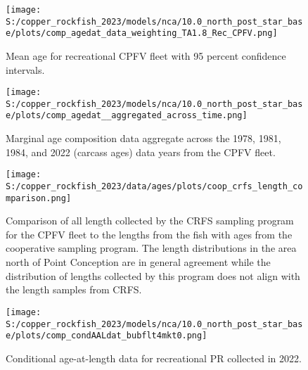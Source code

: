 \documentclass[11pt,
  letterpaper,
]{article}
\begin{document}
\begin{figure}
{\centering
\texttt{[image: S:/copper\_rockfish\_2023/models/nca/10.0\_north\_post\_star\_base/plots/comp\_agedat\_data\_weighting\_TA1.8\_Rec\_CPFV.png]}
}
\caption{Mean age for recreational CPFV fleet with 95 percent confidence intervals.\label{fig:mean-rec-cpfv-age-data}}
\end{figure}

\begin{figure}
{\centering
\texttt{[image: S:/copper\_rockfish\_2023/models/nca/10.0\_north\_post\_star\_base/plots/comp\_agedat\_\_aggregated\_across\_time.png]}
}
\caption{Marginal age composition data aggregate across the 1978, 1981, 1984, and 2022 (carcass ages) data years from the CPFV fleet.\label{fig:rec-cpfv-marg-age-data}}
\end{figure}

\pagebreak

\begin{figure}
{\centering
\texttt{[image: S:/copper\_rockfish\_2023/data/ages/plots/coop\_crfs\_length\_comparison.png]}
}
\caption{Comparison of all length collected by the CRFS sampling program for the CPFV fleet to the lengths from the fish with ages from the cooperative sampling program. The length distributions in the area north of Point Conception are in general agreement while the distribution of lengths collected by this program does not align with the length samples from CRFS.\label{fig:coop-len-comparison}}
\end{figure}

\pagebreak

\begin{figure}
{\centering
\texttt{[image: S:/copper\_rockfish\_2023/models/nca/10.0\_north\_post\_star\_base/plots/comp\_condAALdat\_bubflt4mkt0.png]}
}
\caption{Conditional age-at-length data for recreational PR collected in 2022.\label{fig:rec-pr-caal-data}}
\end{figure}
\end{document}
